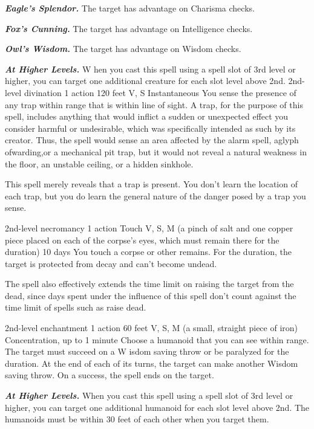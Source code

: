\documentclass[10pt,twoside,twocolumn,openany]{book}
\newcommand\impact[1]{
	\textbf{\textit{#1}}
}
\begin{document}
\impact{Eagle's Splendor.} The target has advantage on Charisma checks.

\impact{Fox's Cunning.} The target has advantage on Intelligence checks.

\impact{Owl's Wisdom.} The target has advantage on Wisdom checks.

\impact{At Higher Levels.} W hen you cast this spell using a spell slot of 3rd level or higher, you can target one additional creature for each slot level above 2nd.
\newpage
{}
{2nd-level divination}
{\color{action}1 action}
{120 feet}
{V, S}
{Instantaneous}
%
You sense the presence of any trap within range that is within line of sight. A trap, for the purpose of this spell, includes anything that would inflict a sudden or unexpected effect you consider harmful or undesirable, which was specifically intended as such by its creator. Thus, the spell would sense an area affected by the alarm spell, aglyph ofwarding,or a mechanical pit trap, but it would not reveal a natural weakness in the floor, an unstable ceiling, or a hidden sinkhole.

This spell merely reveals that a trap is present. You don’t learn the location of each trap, but you do learn the general nature of the danger posed by a trap you sense.

{2nd-level necromancy}
{\color{action}1 action}
{Touch}
{V, S, M (a pinch of salt and one copper piece placed on each of the corpse’s eyes, which must remain there for the duration)}
{10 days}
%
You touch a corpse or other remains. For the duration, the target is protected from decay and can’t become undead.

The spell also effectively extends the time limit on raising the target from the dead, since days spent under the influence of this spell don’t count against the time limit of spells such as raise dead.

{2nd-level enchantment}
{\color{action}1 action}
{60 feet}
{V, S, M (a small, straight piece of iron)}
{{\color{concentration}Concentration}, up to 1 minute}
%
Choose a humanoid that you can see within range. The target must succeed on a W isdom saving throw or be paralyzed for the duration. At the end of each of its turns, the target can make another Wisdom saving throw. On a success, the spell ends on the target.

\impact{At Higher Levels.} When you cast this spell using a spell slot of 3rd level or higher, you can target one additional humanoid for each slot level above 2nd. The humanoids must be within 30 feet of each other when you target them.
\end{document}
